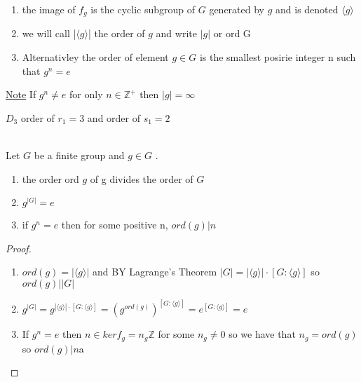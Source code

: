 \documentclass{article}
\begin{document}
\begin{definition}
    \begin{enumerate}
        \item the image of $f_g$ is the cyclic subgroup of $G$ generated by $g$ and is denoted $\langle g \rangle$
        \item we will call |$\langle g \rangle$| the order of $g$ and write $|g|$ or ord G
        \item Alternativley the order of element $g\in G $ is the smallest posirie integer n such that $g^n = e$
    \end{enumerate}
\end{definition}
\underline{Note} If $g^n \not = e$ for only $n \in \mathbb{Z}^+$ then $|g| = \infty$ \\
\begin{definition}
    $D_3$ order of $r_1 = 3$ and order of $s_1 = 2$
\end{definition} 
\begin{proposition}[2.6.3] \leavevmode \\ 
    Let $G$ be a finite group and $g \in G$ . 
    \begin{enumerate}
        \item the order ord $g$ of g divides the order of $G$
        \item $ g^{|G|} = e$
        \item if $g^n = e$ then for some positive n, $ord(g) | n$
    \end{enumerate}
    
    
\end{proposition}
\begin{proof}
    \leavevmode \\ 
    \begin{enumerate}
        \item $ord(g) = | \langle g \rangle |$ and BY Lagrange's Theorem $|G| = | \langle g \rangle | \cdot [G : \langle g \rangle ]$ so $ord(g) | |G|$
        \item $g^{|G|} = g^{| \langle g \rangle | \cdot [G : \langle g \rangle ]} = (g^{ord(g)})^{[G : \langle g \rangle ]} = e^{[G : \langle g \rangle ]} = e$
        \item If $g^n  = e$ then $n \in ker f_g = n_g \mathbb{Z}$ for some $n_g \not = 0 $ so we have that $n_g = ord(g)$ so $ord(g) | n$a
    \end{enumerate}
\end{proof}
 
\end{document}
